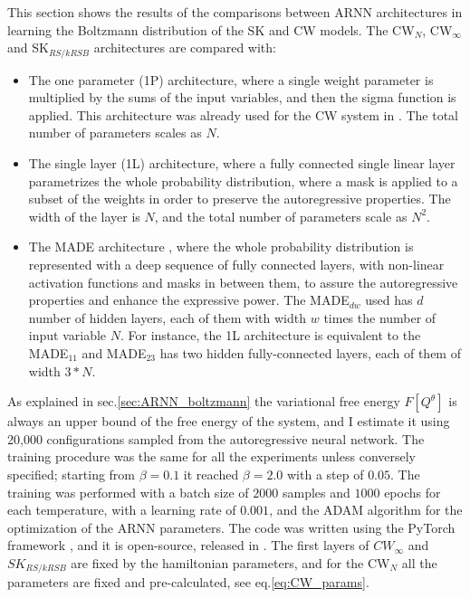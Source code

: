 \documentclass[aps,physrev,10pt,floatfix,reprint]{revtex4-2}
\begin{document}
This section shows the results of the comparisons between ARNN architectures in learning the Boltzmann distribution of the SK and CW models. 
The CW$_N$, CW$_{\infty}$ and SK$_{RS/kRSB}$ architectures are compared with: 
\begin{itemize}
    \item The one parameter (1P) architecture, where a single weight parameter is multiplied by the sums of the input variables, and then the sigma function is applied. This architecture was already used for the CW system in \cite{https://doi.org/10.48550/arxiv.2210.11145}. The total number of parameters scales as $N$.
    \item The single layer (1L) architecture, where a fully connected single linear layer parametrizes the whole probability distribution, where a mask is applied to a subset of the weights in order to preserve the autoregressive properties. The width of the layer is $N$, and the total number of parameters scale as $N^2$.
    \item The MADE architecture \cite{pmlr-v37-germain15}, where the whole probability distribution is represented with a deep sequence of fully connected layers, with non-linear activation functions and masks in between them, to assure the autoregressive properties and enhance the expressive power. The MADE$_{dw}$ used has $d$ number of hidden layers, each of them with width $w$ times the number of input variable $N$. For instance, the 1L architecture is equivalent to the MADE$_{11}$ and MADE$_{23}$ has two hidden fully-connected layers, each of them of width $3*N$. 
\end{itemize}
As explained in sec.\ref{sec:ARNN_boltzmann} the variational free energy $F[Q^{\theta}]$ is always an upper bound of the free energy of the system, and I estimate it using 20,000 configurations sampled from the autoregressive neural network.
The training procedure was the same for all the experiments unless conversely specified; starting from $\beta=0.1$ it reached $\beta=2.0$ with a step of $0.05$. The training was performed with a batch size of $2000$ samples and $1000$ epochs for each temperature, with a learning rate of $0.001$, and the ADAM algorithm for the optimization of the ARNN parameters. The code was written using the PyTorch framework \cite{NEURIPS2019_bdbca288}, and it is open-source, released in \cite{mygithub}.
The first layers of $CW_{\infty}$ and $SK_{RS/kRSB}$ are fixed by the hamiltonian parameters, and for the CW$_N$ all the parameters are fixed and pre-calculated, see eq.\ref{eq:CW_params}.
\end{document}
